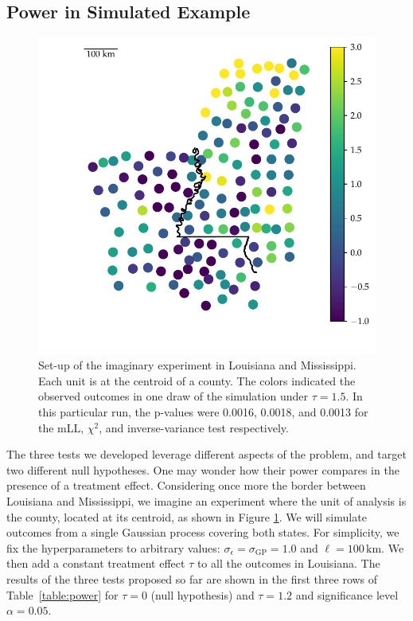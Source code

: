 \documentclass[letter]{article}
\makeatletter
\def\maxwidth{\ifdim\Gin@nat@width>\linewidth\linewidth
\else\Gin@nat@width\fi}
\let\Oldincludegraphics\includegraphics
\renewcommand{\includegraphics}[1]{\Oldincludegraphics[width=0.9\maxwidth]{#1}}
\newcommand{\sigmaf}{\sigma_{\mathrm{GP}}}
\newcommand{\sigman}{\sigma_{\epsilon}}
\makeatother
\begin{document}
\label{eq:calib_test}
    


    	\hypertarget{power-in-simulated-example}{%
\subsection{Power in Simulated Example}\label{power-in-simulated-example}}

\label{sec:powersim}
    


    	\begin{figure}
\centering
\includegraphics{../figures/mississippi_sim.pdf}
\caption{\label{fig:mississippi_counties}Set-up of the imaginary experiment in Louisiana and Mississippi. Each unit is at the centroid of a county. The colors indicated the observed outcomes in one draw of the simulation under \(\tau=1.5\). In this particular run, the p-values were 0.0016, 0.0018, and 0.0013 for the mLL, \(\chi^2\), and inverse-variance test respectively.}
\end{figure}
    


    	The three tests we developed leverage different aspects of the problem, and target two different null hypotheses. One may wonder how their power compares in the presence of a treatment effect. Considering once more the border between Louisiana and Mississippi, we imagine an experiment where the unit of analysis is the county, located at its centroid, as shown in Figure \ref{fig:mississippi_counties}.
We will simulate outcomes from a single Gaussian process covering both states. For simplicity, we fix the hyperparameters to arbitrary values: \(\sigman=\sigmaf=1.0\) and \(\ell=100\,\mathrm{km}\).
We then add a constant treatment effect \(\tau\) to all the outcomes in Louisiana.
The results of the three tests proposed so far are shown in the first three rows of Table~\ref{table:power} for \(\tau=0\) (null hypothesis) and \(\tau=1.2\) and significance level \(\alpha=0.05\).
    
\end{document}
